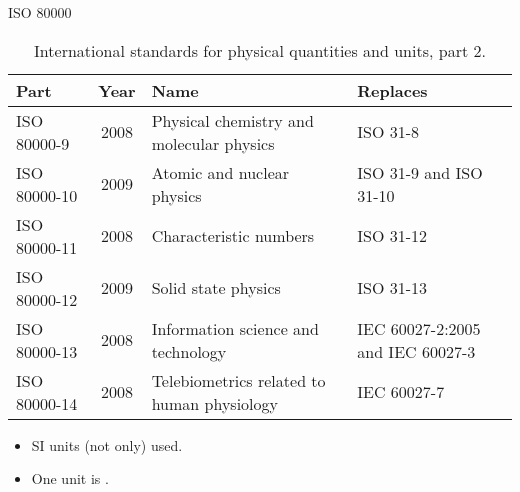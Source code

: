 \documentclass[xcolor=dvipsnames, aspectratio=169, handout, intlimits]{beamer}
\begin{document}
\begin{frame}{ISO 80000}

\vspace{-0.75cm}
\begin{table}
	\caption{International standards for physical quantities and units, part 2.}
	\vspace{-0.1cm}
	\begin{tabular}{lcp{66mm}p{37mm}}
		Part & Year & Name & Replaces \\ 
		\toprule
		ISO 80000-9 & 2008 & \small{Physical chemistry and molecular physics} & \small{ISO 31-8} \\ 
		ISO 80000-10 & 2009 & \small{Atomic and nuclear physics} & \small{ISO 31-9 and ISO 31-10} \\ 
		ISO 80000-11 & 2008 & \small{Characteristic numbers} & \small{ISO 31-12} \\ 
		ISO 80000-12 & 2009 & \small{Solid state physics} & \small{ISO 31-13} \\ 
		ISO 80000-13 & 2008 & \small{Information science and technology} & \small{IEC 60027-2:2005 and IEC 60027-3} \\ 
		ISO 80000-14 & 2008 & \small{Telebiometrics related to human physiology} & \small{IEC 60027-7} \\ 
		\bottomrule
	\end{tabular}
\end{table}

\begin{itemize}
	\item SI units (not only) used.
	\item One unit is .
\end{itemize}

\end{frame}
\end{document}
